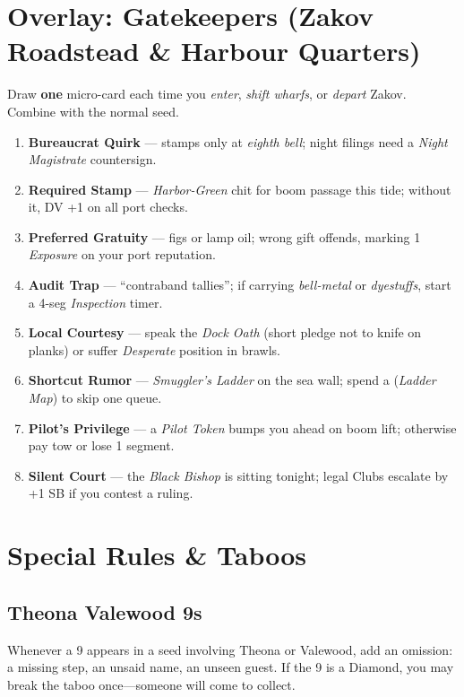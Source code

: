 \documentclass[11pt,letterpaper,twoside]{book}
\begin{document}
\section{Overlay: Gatekeepers (Zakov Roadstead \& Harbour Quarters)}
Draw \textbf{one} micro-card each time you \emph{enter}, \emph{shift wharfs}, or \emph{depart} Zakov. Combine with the normal seed.

\begin{tcolorbox}[enhanced,breakable,sharp corners,boxrule=.6pt,title={Zakov Gatekeepers Micro-Cards (draw 1)}]
\begin{enumerate}[label=\arabic*.]
  \item \textbf{Bureaucrat Quirk} --- stamps only at \emph{eighth bell}; night filings need a \emph{Night Magistrate} countersign.
  \item \textbf{Required Stamp} --- \emph{Harbor-Green} chit for boom passage this tide; without it, DV +1 on all port checks.
  \item \textbf{Preferred Gratuity} --- figs or lamp oil; wrong gift offends, marking 1 \emph{Exposure} on your port reputation.
  \item \textbf{Audit Trap} --- ``contraband tallies''; if carrying \emph{bell-metal} or \emph{dyestuffs}, start a 4-seg \emph{Inspection} timer.
  \item \textbf{Local Courtesy} --- speak the \emph{Dock Oath} (short pledge not to knife on planks) or suffer \emph{Desperate} position in brawls.
  \item \textbf{Shortcut Rumor} --- \emph{Smuggler's Ladder} on the sea wall; spend a \SuitDiamond{} (\emph{Ladder Map}) to skip one queue.
  \item \textbf{Pilot's Privilege} --- a \emph{Pilot Token} bumps you ahead on boom lift; otherwise pay tow or lose 1 segment.
  \item \textbf{Silent Court} --- the \emph{Black Bishop} is sitting tonight; legal Clubs escalate by +1 SB if you contest a ruling.
\end{enumerate}
\end{tcolorbox}

\section{Special Rules \& Taboos}

\subsection{Theona Valewood 9s}
Whenever a 9 appears in a seed involving Theona or Valewood, add an omission: a missing step, an unsaid name, an unseen guest. If the 9 is a Diamond, you may break the taboo once---someone will come to collect.
\end{document}
